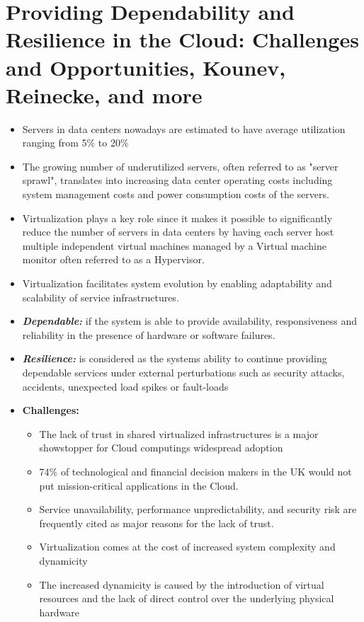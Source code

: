 \section{Providing Dependability and Resilience in the Cloud: Challenges and Opportunities, Kounev, Reinecke, and more}

\begin{itemize}
  \item Servers in data centers nowadays are estimated to have average utilization ranging from 5\% to 20\%
  \item The growing number of underutilized servers, often referred to as "server sprawl", translates into increasing data center operating costs including system management costs and power consumption costs of the servers.
  \item Virtualization plays a key role since it makes it possible to significantly reduce the number of servers in data centers by having each server host multiple independent virtual machines managed by a Virtual machine monitor often referred to as a Hypervisor.
  \item Virtualization facilitates system evolution by enabling adaptability and scalability of service infrastructures.
  \item \textbf{\textit{Dependable:}} if the system is able to provide availability, responsiveness and reliability in the presence of hardware or software failures.
  \item \textbf{\textit{Resilience: }} is considered as the systems ability to continue providing dependable services under external perturbations such as security attacks, accidents, unexpected load spikes or fault-loads 
  \item \textbf{Challenges:}
  \begin{itemize}
  	\item The lack of trust in shared virtualized infrastructures is a major showstopper for Cloud computings widespread adoption
  	\item 74\% of technological and financial decision makers in the UK would not put mission-critical applications in the Cloud.
  	\item Service unavailability, performance unpredictability, and security risk are frequently cited as major reasons for the lack of trust.
  	\item Virtualization comes at the cost of increased system complexity and dynamicity
  	\item The increased dynamicity is caused by the introduction of virtual resources and the lack of direct control over the underlying physical hardware

\end{itemize}
\end{itemize}
